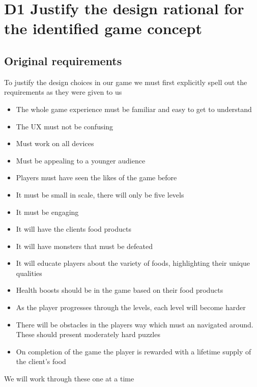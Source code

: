 \documentclass{article}
\begin{document}
\section{D1 Justify the design rational for the identified game concept}


\subsection{Original requirements}
To justify the design choices in our game we must first explicitly spell out the requirements as they were given to us

\begin{itemize}
\item The whole game experience must be familiar and easy to get to understand
\item The UX must not be confusing
\item Must work on all devices
\item Must be appealing to a younger audience
\item Players must have seen the likes of the game before
\item It must be small in scale, there will only be five levels
\item It must be engaging
\item It will have the clients food products
\item It will have monsters that must be defeated
\item It will educate players about the variety of foods, highlighting their unique qualities
\item Health boosts should be in the game based on their food products
\item As the player progresses through the levels, each level will become harder
\item There will be obstacles in the players way which must an navigated around. These should present moderately hard puzzles
\item On completion of the game the player is rewarded with a lifetime supply of the client's food
\end{itemize}

We will work through these one at a time
\end{document}
